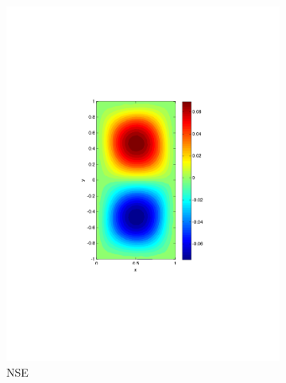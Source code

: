 \begin{figure}
  \begin{center}
  \begin{subfigure}{0.4\textwidth}
    \centering
    \includegraphics[scale=0.5]{Figures/Re200h16k1000}
    \caption{NSE}
    \label{sfi:NSE}
  \end{subfigure}
  \begin{subfigure}{0.4\textwidth}
    \centering

\end{subfigure}
\end{center}
\end{figure}

